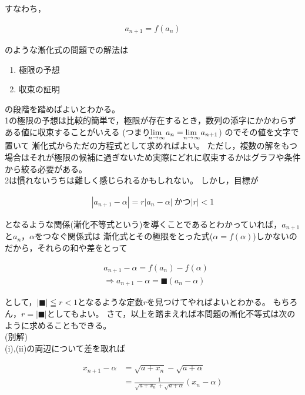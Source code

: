 \documentclass[autodetect-engine,ja=standard, 10.5pt, a4paper, titlepage]{bxjsarticle}
\begin{document}
\begin{enumerate}[1.]
    すなわち，
    \begin{fleqn}[20pt]
      \begin{align*}
        a_{n+1} = f(a_n)
      \end{align*}
    \end{fleqn}
    のような漸化式の問題での解法は
    \begin{enumerate}[1.]
      \item 極限の予想
      \item 収束の証明
    \end{enumerate}
    の段階を踏めばよいとわかる。\\
    1の極限の予想は比較的簡単で，極限が存在するとき，数列の添字にかかわらずある値に収束することがいえる
    (つまり$\lim \!\!\!\!\!\!\!\!\!\!\! \raisebox{-4pt}{$_{n\to\infty}$}a_n = \lim \!\!\!\!\!\!\!\!\!\!\! \raisebox{-4pt}{$_{n\to\infty}$}a_{n+1}$)
    のでその値を文字で置いて
    漸化式からただの方程式として求めればよい。
    ただし，複数の解をもつ場合はそれが極限の候補に過ぎないため実際にどれに収束するかはグラフや条件から絞る必要がある。 \\
    2は慣れないうちは難しく感じられるかもしれない。
    しかし，目標が
      \begin{fleqn}[20pt]
        \begin{align*}
          |a_{n+1} - \alpha| = r|a_n - \alpha|\: \text{かつ}|r|<1
        \end{align*}
      \end{fleqn}
    となるような関係(漸化不等式という)を導くことであるとわかっていれば，$a_{n+1}$と$a_n$，$\alpha$をつなぐ関係式は
    漸化式とその極限をとった式($\alpha = f(\alpha)$)しかないのだから，それらの和や差をとって
      \begin{fleqn}[20pt]
        \begin{align*}
          &a_{n+1} - \alpha = f(a_n) - f(\alpha)\\
          &\Rightarrow a_{n+1} - \alpha = \text{■}(a_n - \alpha)
        \end{align*}
      \end{fleqn}
    として，$|\text{■}|\leqq r < 1$となるような定数$r$を見つけてやればよいとわかる。
    もちろん，$r = |\text{■}|$としてもよい。
    \baselineskip
    \noindent さて，以上を踏まえれば本問題の漸化不等式は次のように求めることもできる。\\
    \noindent (別解)\\
    (i),(ii)の両辺について差を取れば
      \begin{fleqn}[20pt]
        \begin{align*}
          x_{n+1} - \alpha
          &= \sqrt{a + x_n} - \sqrt{a + \alpha}\\
          &= \frac{1}{\sqrt{a + x_n} + \sqrt{a + \alpha}}(x_n - \alpha)
        \end{align*}
      \end{fleqn}


\end{enumerate}
\end{document}
